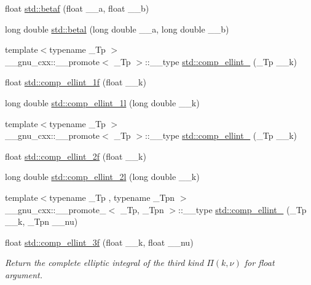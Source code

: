 \begin{DoxyCompactItemize}
\item 
float \hyperlink{group__tr29124__math__spec__func_ga12dc61ee4c09172151cf092ed387e203}{std\+::betaf} (float \+\_\+\+\_\+a, float \+\_\+\+\_\+b)
\item 
long double \hyperlink{group__tr29124__math__spec__func_ga8caca1cef099f41a88111209c36ce06c}{std\+::betal} (long double \+\_\+\+\_\+a, long double \+\_\+\+\_\+b)
\item 
{\footnotesize template$<$typename \+\_\+\+Tp $>$ }\\\+\_\+\+\_\+gnu\+\_\+cxx\+::\+\_\+\+\_\+promote$<$ \+\_\+\+Tp $>$\+::\+\_\+\+\_\+type \hyperlink{group__tr29124__math__spec__func_gac559500c604c43ea943d593c9ad9d289}{std\+::comp\+\_\+ellint\+\_} (\+\_\+\+Tp \+\_\+\+\_\+k)
\item 
float \hyperlink{group__tr29124__math__spec__func_ga7fb5be999a8125cf7e55e630eb8444a1}{std\+::comp\+\_\+ellint\+\_\+1f} (float \+\_\+\+\_\+k)
\item 
long double \hyperlink{group__tr29124__math__spec__func_ga7247d3dd77c1ff5df3c059fed862dc48}{std\+::comp\+\_\+ellint\+\_\+1l} (long double \+\_\+\+\_\+k)
\item 
{\footnotesize template$<$typename \+\_\+\+Tp $>$ }\\\+\_\+\+\_\+gnu\+\_\+cxx\+::\+\_\+\+\_\+promote$<$ \+\_\+\+Tp $>$\+::\+\_\+\+\_\+type \hyperlink{group__tr29124__math__spec__func_ga22fcc678829f0daf2de257896378e7e0}{std\+::comp\+\_\+ellint\+\_} (\+\_\+\+Tp \+\_\+\+\_\+k)
\item 
float \hyperlink{group__tr29124__math__spec__func_ga21700f2f125c42b1f1da1f9c7eea1135}{std\+::comp\+\_\+ellint\+\_\+2f} (float \+\_\+\+\_\+k)
\item 
long double \hyperlink{group__tr29124__math__spec__func_ga47b647ec386c8d4b18a030c97842df18}{std\+::comp\+\_\+ellint\+\_\+2l} (long double \+\_\+\+\_\+k)
\item 
{\footnotesize template$<$typename \+\_\+\+Tp , typename \+\_\+\+Tpn $>$ }\\\+\_\+\+\_\+gnu\+\_\+cxx\+::\+\_\+\+\_\+promote\+\_$<$ \+\_\+\+Tp, \+\_\+\+Tpn $>$\+::\+\_\+\+\_\+type \hyperlink{group__tr29124__math__spec__func_gad833404645e24b7f0598a640ff92d623}{std\+::comp\+\_\+ellint\+\_} (\+\_\+\+Tp \+\_\+\+\_\+k, \+\_\+\+Tpn \+\_\+\+\_\+nu)
\item 
float \hyperlink{group__tr29124__math__spec__func_ga76834d3112f777703330892303267a39}{std\+::comp\+\_\+ellint\+\_\+3f} (float \+\_\+\+\_\+k, float \+\_\+\+\_\+nu)
\begin{DoxyCompactList}\small\item\em Return the complete elliptic integral of the third kind $ \Pi(k,\nu) $ for {\ttfamily float} argument. \end{DoxyCompactList}\item 

\end{DoxyCompactItemize}
